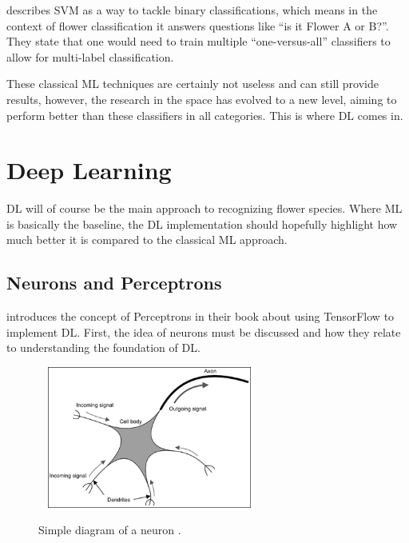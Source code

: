 \documentclass[12pt,a4paper]{report}
\begin{document}
\par

\citet{NobleWilliamS2006Wias} describes SVM as a way to tackle binary classifications, which means in the 
context of flower classification it answers questions like “is it Flower A or B?”. They state that one would need
to train multiple “one-versus-all” classifiers to allow for multi-label classification.

\par

These classical ML techniques are certainly not useless and can still provide results, however, the research in the 
space has evolved 
to a new level, aiming to perform better than these classifiers in all categories. This is where DL comes in.

\section{Deep Learning}

DL will of course be the main approach to recognizing flower species. Where ML is basically the baseline, the DL 
implementation should hopefully highlight how much better it is compared to the classical ML approach.

\subsection{Neurons and Perceptrons}

\citet{ScarpinoMatthew2018Tfd} introduces the concept of Perceptrons in their book about using TensorFlow 
to implement DL. First, the idea of neurons must be discussed and how they relate to understanding the foundation of DL.

\begin{figure}[h]\
    \centering
    \includegraphics[width=0.6\textwidth]{neuron.png}
    \caption{Simple diagram of a neuron \citep{ScarpinoMatthew2018Tfd}.}
    \label{fig:neuron}
\end{figure}
\end{document}
